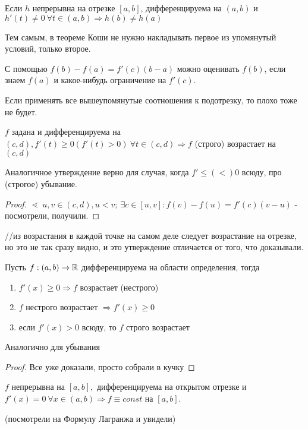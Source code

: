 \documentclass[12pt]{report}
\begin{document}
\begin{note}
Если $h$ непрерывна на отрезке $[a, b]$, дифференцируема на $(a, b)$ и $h'(t) \neq 0 ~\forall t \in (a, b) \Rightarrow h(b) \neq h(a)$

Тем самым, в теореме Коши не нужно накладывать первое из упомянутый условий, только второе.
\end{note}

\begin{note}[2]
С помощью $f(b) - f(a) = f'(c)(b - a)$ можно оценивать $f(b)$, если знаем $f(a)$ и какое-нибудь ограничение на $f'(c)$.

Если применять все вышеупомянутые соотношения к подотрезку, то плохо тоже не будет.
\end{note}

\begin{cor}
$f$ задана и дифференцируема на $(c, d), f'(t) \ge 0 (f'(t) > 0) ~\forall t \in (c, d) \Rightarrow f$ (строго) возрастает на $(c, d)$

Аналогичное утверждение верно для случая, когда $f' \le (<) 0$ всюду, про (строгое) убывание.
\end{cor}
\begin{proof}
$\lessdot ~u, v \in (c, d), u < v; ~\exists c \in [u, v]: f(v) - f(u) = f'(c)(v - u)$ - посмотрели, получили.
\end{proof}
//из возрастания в каждой точке на самом деле следует возрастание на отрезке, но это не так сразу видно, и это утверждение отличается от того, что доказывали.

\begin{thm}
Пусть $f: (a, b) \to \mathbb{R}$ дифференцируема на области определения, тогда
\begin{enumerate}
\item $f'(x) \ge 0 \Rightarrow f$ возрастает (нестрого)
\item $f$ нестрого возрастает $\Rightarrow f'(x) \ge 0$
\item если $f'(x) > 0$ всюду, то $f$ строго возрастает
\end{enumerate}

Аналогично для убывания
\end{thm}
\begin{proof}
Все уже доказали, просто собрали в кучку
\end{proof}

\begin{st}
$f$ непрерывна на $[a, b],$ дифференцируема на открытом отрезке и $f'(x) = 0 ~\forall x \in (a, b) \Rightarrow f \equiv const$ на $[a, b]$.

(посмотрели на Формулу Лагранжа и увидели)
\end{st}
\end{document}

